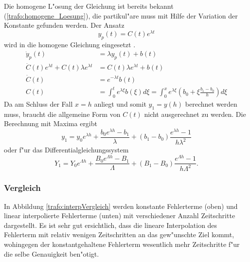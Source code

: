 \begin{refsection}
Die homogene L"osung der Gleichung ist bereits bekannt (\ref{trafo:homogene_Loesung}), die partikul"are muss mit Hilfe der Variation der Konstante gefunden werden. Der Ansatz
\begin{equation*}
	y_p(t) = C(t)e^{\lambda t}
\end{equation*}
wird in die homogene Gleichung eingesetzt \cite{trafo:Mueller}.
\begin{align*}
	\dot{y}_p(t) &= \lambda y_p(t) + b(t) \\
	\dot{C}(t)e^{\lambda t} + C(t)\lambda e^{\lambda t} &= C(t) \lambda e^{\lambda t} + b(t) \\
	\dot{C}(t) &= e^{-\lambda t} b(t) \\
	C(t) &= \int_{0}^{t} e^{\lambda \xi} b(\xi) d\xi = \int_{0}^{x} e^{\lambda \xi} \left(b_0 + \xi \frac{b_1 - b_0}{h}\right) d\xi
\end{align*}
Da am Schluss der Fall $x = h$ anliegt und somit $y_1 = y(h)$ berechnet werden muss, braucht die allgemeine Form von $C(t)$ nicht ausgerechnet zu werden. Die Berechnung mit Maxima ergibt \cite{trafo:Mueller}
\begin{equation}
	y_1 = y_0 e^{\lambda h} + \frac{b_0 e^{\lambda h} - b_1}{\lambda} + \left(b_1 - b_0\right) \frac{e^{\lambda h} -1}{h \lambda^2}
	\label{trafo:linInterp}
\end{equation}
oder f"ur das Differentialgleichungssystem
\begin{equation}
	Y_1 = Y_0 e^{\Lambda h} + \frac{B_0 e^{\Lambda h} - B_1}{\Lambda} + \left(B_1 - B_0\right) \frac{e^{\Lambda h} -1}{h \Lambda^2}.
	\label{trafo:exakteLoesung}
\end{equation}

\subsubsection{Vergleich}
In Abbildung \ref{trafo:interpVergleich} werden konstante Fehlerterme (oben) und linear interpolierte Fehlerterme (unten) mit verschiedener Anzahl Zeitschritte dargestellt. Es ist sehr gut ersichtlich, dass die lineare Interpolation des Fehlerterm mit relativ wenigen Zeitschritten an das gew"unschte Ziel kommt, wohingegen der konstantgehaltene Fehlerterm wesentlich mehr Zeitschritte f"ur die selbe Genauigkeit ben"otigt. 


\end{refsection}
